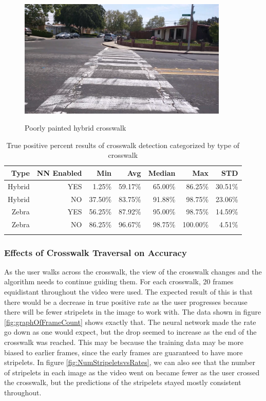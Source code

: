 \documentclass[12pt]{ucthesis}
\newcommand{\captionfonts}{\small\bf\ssp}
\begin{document}
\begin{figure}[H]
\begin{center}
\includegraphics[width=10cm]{PoorlyPaintedHybrid.png}
\captionfonts
\caption[Poorly Painted Hybrid Crosswalk]{Poorly painted hybrid crosswalk}
\label{fig:poorlyPaintedHybrid}
\end{center}
\end{figure}

\begin{table}[t]
    \begin{longtable}[H]{|r|r|r|r|r|r|r|}
    \hline
    Type & \multicolumn{1}{l|}{NN Enabled} & Min & Avg & Median & Max & STD \bigstrut\\
    \hline
    Hybrid & YES & 1.25\% & 59.17\% & 65.00\% & 86.25\% & 30.51\% \bigstrut\\
    \hline
    Hybrid & NO & 37.50\% & 83.75\% & 91.88\% & 98.75\% & 23.06\% \bigstrut\\
    \hline
    Zebra & YES & 56.25\% & 87.92\% & 95.00\% & 98.75\% & 14.59\% \bigstrut\\
    \hline
    Zebra & NO & 86.25\% & 96.67\% & 98.75\% & 100.00\% & 4.51\% \bigstrut\\
    \hline

    \caption{True positive percent results of crosswalk detection categorized by type of crosswalk}
    \label{tab:typeOfCwalk} 
    \end{longtable}
\end{table}

\subsubsection{Effects of Crosswalk Traversal on Accuracy}

As the user walks across the crosswalk, the view of the crosswalk changes and the algorithm needs to continue guiding them. For each crosswalk, 20 frames equidistant throughout the video were used. The expected result of this is that there would be a decrease in true positive rate as the user progresses because there will be fewer stripelets in the image to work with. The data shown in figure \ref{fig:graphOfFrameCount} shows exactly that. The neural network made the rate go down as one would expect, but the drop seemed to increase as the end of the crosswalk was reached. This may be because the training data may be more biased to earlier frames, since the early frames are guaranteed to have more stripelets. In figure \ref{fig:NumStripeletsvsRates}, we can also see that the number of stripelets in each image as the video went on became fewer as the user crossed the crosswalk, but the predictions of the stripelets stayed mostly consistent throughout. 
\end{document}
